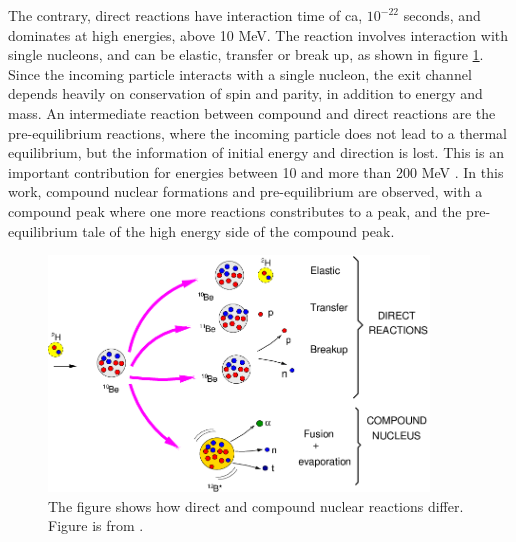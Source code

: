 The contrary, direct reactions have interaction time of ca, $10^{-22}$ seconds, and dominates at high energies, above 10 MeV. The reaction involves interaction with single nucleons, and can be elastic, transfer or break up, as shown in figure \ref{fig:Nuclear_reactions}. Since the incoming particle interacts with a single nucleon, the exit channel depends heavily on conservation of spin and parity, in addition to energy and mass. An intermediate reaction between compound and direct reactions are the pre-equilibrium reactions, where the incoming particle does not lead to a thermal equilibrium, but the information of initial energy and direction is lost. This is an important contribution for energies between 10 and more than 200 MeV \cite{KoningA.J.Akkermans1999}. In this work, compound nuclear formations and pre-equilibrium are observed, with a compound peak where one more reactions constributes to a peak, and the pre-equilibrium tale of the high energy side of the compound peak.   \\

\begin{figure}
    \centering
    \includegraphics[width=0.9\textwidth]{Theory/Direct-and-compound-nucleus-reaction-channels-taking-place-in-a-d-10-Be-reaction.png}
    \caption{The figure shows how direct and compound nuclear reactions differ. Figure is from \cite{Moro2018}. %
    }
    \label{fig:Nuclear_reactions}
\end{figure}

